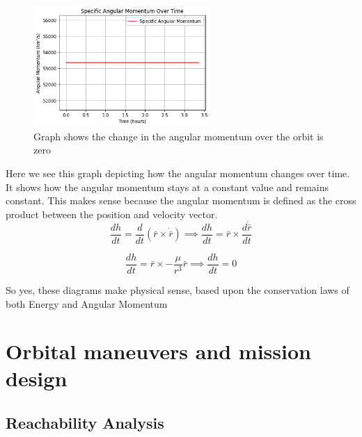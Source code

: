 \documentclass[a4paper, 12pt]{article}  %
\begin{document}
\begin{figure}[H]
    \centering
    \includegraphics[width=0.6\textwidth]{124-L.png}
    \caption{Graph shows the change in the angular momentum over the orbit is zero}
    \label{fig:example}
\end{figure}
\noindent Here we see this graph depicting how the angular momentum changes over time. It shows how the angular momentum stays 
at a constant value and remains constant. This makes sense because the angular momentum is defined as the cross product
between the position and velocity vector.
\setcounter{equation}{0}
\begin{equation}
\frac{dh}{dt} = \frac{d}{dt}(\bar{r} \times \dot{\bar{r}}) \implies \frac{dh}{dt} = \bar{r} \times \frac{d\dot{\bar{r}}}{dt}
\end{equation}

\begin{equation}
\frac{dh}{dt} = \bar{r} \times -\frac{\mu}{r^{3}}\bar{r} \implies \frac{dh}{dt} = 0
\end{equation}
\vspace{0.2cm}

So yes, these diagrams make physical sense, based upon the conservation laws of both Energy and Angular Momentum


\section{Orbital maneuvers and mission design}
\subsection{Reachability Analysis}
\end{document}
